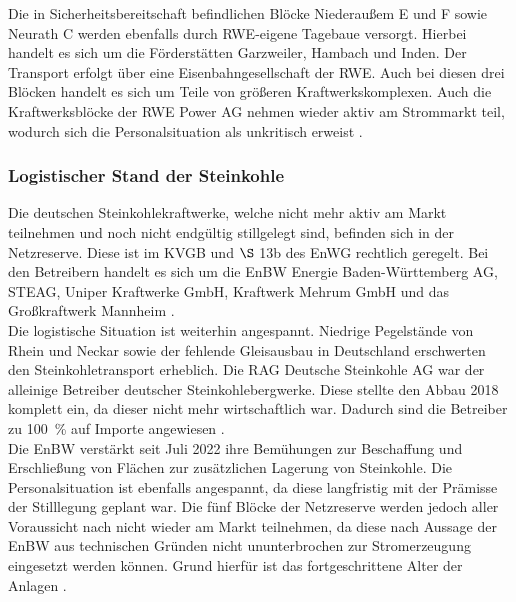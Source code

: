 			Die in Sicherheitsbereitschaft befindlichen Blöcke Niederaußem E und F sowie Neurath C werden ebenfalls durch RWE-eigene Tagebaue versorgt. 
			Hierbei handelt es sich um die Förderstätten Garzweiler, Hambach und Inden. 
			Der Transport erfolgt über eine Eisenbahngesellschaft der RWE. 
			Auch bei diesen drei Blöcken handelt es sich um Teile von größeren Kraftwerkskomplexen. 
			Auch die Kraftwerksblöcke der RWE Power AG nehmen wieder aktiv am Strommarkt teil, wodurch sich die Personalsituation als unkritisch erweist \cite{Mail_RWE}. 
	
		\subsubsection{Logistischer Stand der Steinkohle} \label{sect: Steinkohle}
		
			Die deutschen Steinkohlekraftwerke, welche nicht mehr aktiv am Markt teilnehmen und noch nicht endgültig stillgelegt sind, befinden sich in der Netzreserve. 
			Diese ist im KVGB und $\S$ 13b des EnWG rechtlich geregelt. 
			Bei den Betreibern handelt es sich um die EnBW Energie Baden-Württemberg AG, STEAG, Uniper Kraftwerke GmbH, Kraftwerk Mehrum GmbH und das Großkraftwerk Mannheim \cite{Excel_Kraftwerksliste}. \\
			
			Die logistische Situation ist weiterhin angespannt. 
			Niedrige Pegelstände von Rhein und Neckar sowie der fehlende Gleisausbau in Deutschland erschwerten den Steinkohletransport erheblich. 
			Die RAG Deutsche Steinkohle AG war der alleinige Betreiber deutscher Steinkohlebergwerke. 
			Diese stellte den Abbau 2018 komplett ein, da dieser nicht mehr wirtschaftlich war.
			Dadurch sind die Betreiber zu \SI{100}{\percent} auf Importe angewiesen \cite{Ende_Steinkohle}. \\
			
			Die EnBW verstärkt seit Juli 2022 ihre Bemühungen zur Beschaffung und Erschließung von Flächen zur zusätzlichen Lagerung von Steinkohle.
			Die Personalsituation ist ebenfalls angespannt, da diese langfristig mit der Prämisse der Stilllegung geplant war. 
			Die fünf Blöcke der Netzreserve werden jedoch aller Voraussicht nach nicht wieder am Markt teilnehmen, da diese nach Aussage der EnBW aus technischen Gründen nicht ununterbrochen zur Stromerzeugung eingesetzt werden können. 
			Grund hierfür ist das fortgeschrittene Alter der Anlagen \cite{EnBW_Steinkohle}. \\
			
